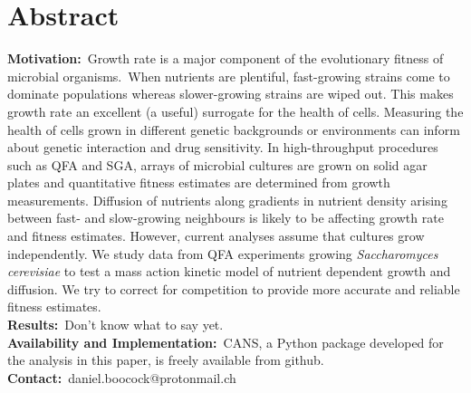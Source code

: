 \section*{Abstract}
\label{sec:abstract}

\textbf{Motivation:}~Growth rate is a major component of the
evolutionary fitness of microbial organisms.~When nutrients are
plentiful, fast-growing strains come to dominate populations whereas
slower-growing strains are wiped out. This makes growth rate an
excellent (a useful) surrogate for the health of cells. Measuring the
health of cells grown in different genetic backgrounds or environments
can inform about genetic interaction and drug sensitivity. In
high-throughput procedures such as QFA and SGA, arrays of microbial
cultures are grown on solid agar plates and quantitative fitness
estimates are determined from growth measurements. Diffusion of
nutrients along gradients in nutrient density arising between fast-
and slow-growing neighbours is likely to be affecting growth rate and
fitness estimates. However, current analyses assume that cultures grow
independently. We study data from QFA experiments growing
\textit{Saccharomyces cerevisiae} to test a mass action kinetic model
of nutrient dependent growth and diffusion. We try to correct for
competition to provide more accurate and reliable fitness estimates.
\\
\textbf{Results:}~Don't know what to say yet.\\
\textbf{Availability and Implementation:}~CANS, a Python package
developed for the analysis in this paper, is freely available from
github.
\\
\textbf{Contact:}~daniel.boocock@protonmail.ch\\

